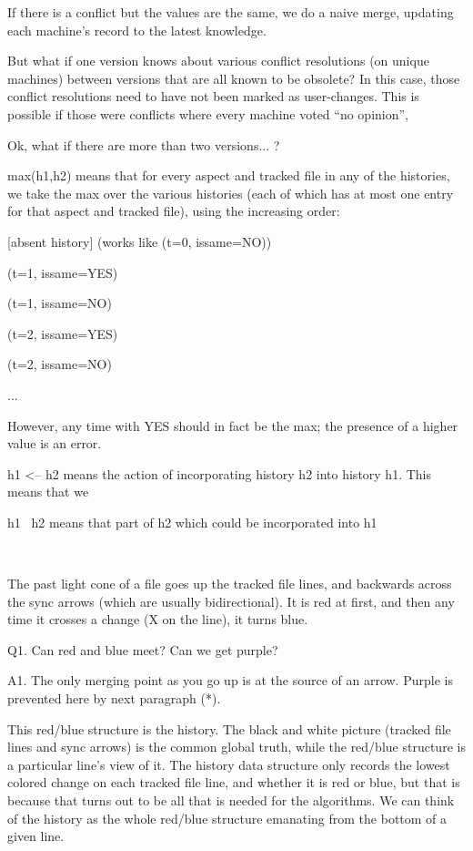 \documentclass{book}
\begin{document}
If there is a conflict but the values are the same, we do a naive merge, updating each machine's record to the latest knowledge.

But what if one version knows about various conflict resolutions (on unique machines) between versions that are all known to be obsolete?
In this case, those conflict resolutions need to have not been marked as user-changes.  This is possible if those were conflicts where every machine voted ``no opinion'',

Ok, what if there are more than two versions... ?

max(h1,h2) means that for every aspect and tracked file in any of the histories, we take the max over the various histories (each of which has at most one entry for that aspect and tracked file), using the increasing order:

	[absent history]  (works like (t=0, issame=NO))

	(t=1, issame=YES)

	(t=1, issame=NO)

	(t=2, issame=YES)

	(t=2, issame=NO)

	...

	However, any time with YES should in fact be the max; the presence of a higher value is an error.

h1 <-- h2 means the action of incorporating history h2 into history h1.  This means that we

h1 \ h2 means that part of h2 which could be incorporated into h1

~

The past light cone of a file goes up the tracked file lines, and backwards across the sync arrows (which are usually bidirectional).  It is red at first, and then any time it crosses a change (X on the line), it turns blue.

Q1. Can red and blue meet?  Can we get purple?

A1. The only merging point as you go up is at the source of an arrow.  Purple is prevented here by next paragraph (*).

This red/blue structure is the history.  The black and white picture (tracked file lines and sync arrows) is the common global truth, while the red/blue structure is a particular line's view of it.  The history data structure only records the lowest colored change on each tracked file line, and whether it is red or blue, but that is because that turns out to be all that is needed for the algorithms.  We can think of the history as the whole red/blue structure emanating from the bottom of a given line.
\end{document}
